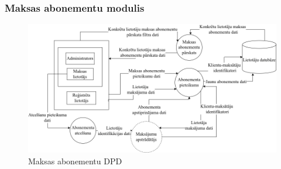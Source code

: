 \subsubsection{Maksas abonementu modulis}

\begin{figure}[htbp]
	\centering
	\includegraphics[width=\linewidth]{./src/img/MaksasAbonementaModuls.png}
	\caption{Maksas abonementu DPD}
	\label{fig:dpd-2-premium-user}
\end{figure}




